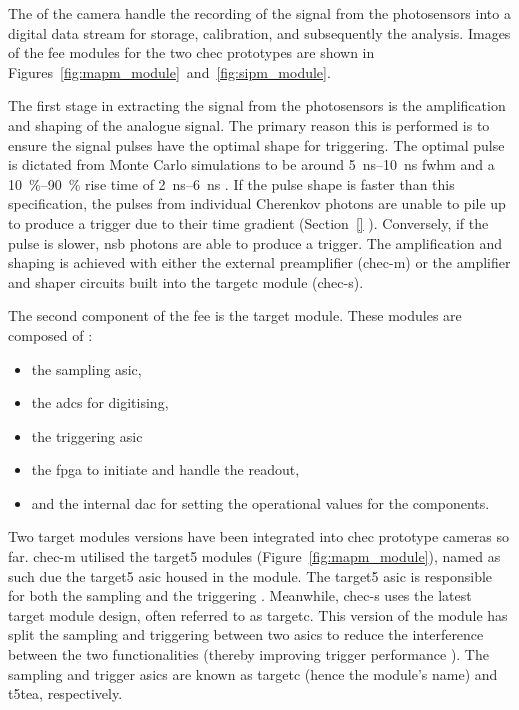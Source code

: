 The  of the camera handle the recording of the signal from the photosensors into a digital data stream for storage, calibration, and subsequently the analysis. Images of the \gls{fee} modules for the two \gls{chec} prototypes are shown in Figures~\ref{fig:mapm_module}~and~\ref{fig:sipm_module}.

The first stage in extracting the signal from the photosensors is the amplification and shaping of the analogue signal. The primary reason this is performed is to ensure the signal pulses have the optimal shape for triggering. The optimal pulse is dictated from Monte Carlo simulations to be around \SIrange{5}{10}{ns} \gls{fwhm} and a \SIrange{10}{90}{\percent} rise time of \SIrange{2}{6}{ns} \cite{Zorn2017}. If the pulse shape is faster than this specification, the pulses from individual Cherenkov photons are unable to pile up to produce a trigger due to their time gradient (Section~\ref{} ). Conversely, if the pulse is slower, \gls{nsb} photons are able to produce a trigger. The amplification and shaping is achieved with either the external preamplifier (\gls{chec-m}) or the amplifier and shaper circuits built into the \gls{targetc} module (\gls{chec-s}).

The second component of the \gls{fee} is the \gls{target} module. These modules are composed of \cite{Funk2017}: 
\begin{itemize}
\item the sampling \gls{asic},
\item the \glspl{adc} for digitising,
\item the triggering \gls{asic}
\item the \gls{fpga} to initiate and handle the readout,
\item and the internal \gls{dac} for setting the operational values for the components.
\end{itemize}
Two \gls{target} modules versions have been integrated into \gls{chec} prototype cameras so far. \gls{chec-m} utilised the \gls{target5} modules (Figure~\ref{fig:mapm_module}), named as such due the \gls{target5} \gls{asic} housed in the module. The \gls{target5} \gls{asic} is responsible for both the sampling and the triggering \cite{Albert2017}. Meanwhile, \gls{chec-s} uses the latest \gls{target} module design, often referred to as \gls{targetc}. This version of the module has split the sampling and triggering between two \glspl{asic} to reduce the interference between the two functionalities (thereby improving trigger performance \cite{Funk2017}). The sampling and trigger \glspl{asic} are known as \gls{targetc} (hence the module's name) and \gls{t5tea}, respectively.

